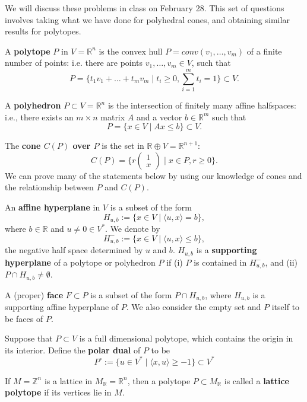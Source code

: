 \documentclass{exam}
\newcommand{\rr}{\mathbb{R}}
\newcommand{\zz}{\mathbb{Z}}
\begin{document}
We will discuss these problems in class on February 28.
This set of questions involves taking what we have done for polyhedral cones, and obtaining
similar results for polytopes.

\bigskip
A {\bf polytope} $P$ in $V = \rr^n$ is the convex hull $P = conv(v_1, \ldots, v_m)$ of a finite number of points: i.e. there are
points $v_1, \ldots, v_m \in V$, such that
\[ P = \{ t_1 v_1 + \ldots + t_m v_m \mid t_i \ge 0, \sum_{i=1}^m t_i = 1 \} \subset V. \]

\medskip
A {\bf polyhedron} $P \subset V = \rr^n$ is the intersection of finitely many affine halfspaces:
i.e., there exists an $m \times n$ matrix $A$ and a vector $b \in \rr^m$ such that
  \[ P = \{ x \in V \mid  Ax \le b \} \subset V. \]

\medskip  
The {\bf cone $C(P)$ over $P$} is the set in $\rr \oplus V = \rr^{n+1}$:
  \[ C(P) = \{ r \begin{pmatrix}1 \\ x \end{pmatrix} \mid x \in P, r \ge 0 \}. \]
  We can prove many of the statements below by using our knowledge of cones and the relationship
  between $P$ and $C(P)$.

  \medskip  
  An {\bf affine hyperplane} in $V$ is a subset of the form
  \[ H_{u,b} := \{ x \in V \mid \langle u, x \rangle = b \}, \]
  where $b \in \rr$ and $u \ne 0 \in V^*$. We denote by
  \[ H^-_{u,b} := \{ x \in V \mid \langle u, x \rangle \le b \}, \]
  the negative half space determined by $u$ and $b$.
  $H_{u,b}$ is a {\bf supporting hyperplane} of a polytope or polyhedron $P$ if
  (i) $P$ is contained in $H^-_{u,b}$, and
  (ii) $P \cap H_{u,b} \ne \emptyset$.

\medskip  
  A (proper) {\bf face} $F \subset P$ is a subset of the form $P \cap H_{u,b}$, where $H_{u,b}$ is a supporting
  affine hyperplane of $P$.  We also consider the empty set and $P$ itself to be faces of $P$.

  \medskip
  Suppose that $P \subset V$ is a full dimensional polytope, which contains the origin in its interior.
  Define the {\bf polar dual} of $P$ to be
  \[ P^\circ := \{ u \in V^* \mid \langle x, u \rangle \ge -1 \} \subset V^* \]
  \medskip

  \medskip If $M = \zz^n$ is a lattice in $M_\rr = \rr^n$, then a polytope $P \subset M_\rr$ is called a
           {\bf lattice polytope} if its vertices lie in $M$.
           
\end{document}
